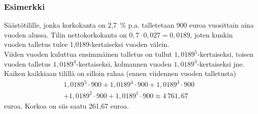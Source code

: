\documentclass{beamer}\usepackage[]{graphicx}\usepackage[]{color}
\theoremstyle{remark}
\newtheorem{esim}{Esimerkki}
\newtheorem{ratkaisu}{Ratkaisuehdotus}
\newcommand{\pblock}{\\ \vspace{0.5cm}\pause}
\begin{document}
% 

\begin{frame}
    \frametitle{Esimerkki}  
    Säästötilille, jonka korkokanta on 2{,}7~\% p.a. talletetaan 900 euroa vuosittain aina vuoden alussa. 
    \pause 
    Tilin nettokorkokanta on \(0,7\cdot0{,}027 = 0{,}0189\), joten kunkin vuoden talletus tulee 1{,}0189-kertaiseksi vuoden välein. 
    \pblock 
    Viiden vuoden kuluttua ensimmäinen talletus on tullut \(1{,}0189^5\)-kertaiseksi\pause, toisen vuoden talletus \(1{,}0189^4\)-kertaiseksi\pause, kolmannen vuoden \(1{,}0189^3\)-kertaiseksi jne. \pause Kaiken kaikkiaan tilillä on silloin rahaa (ennen viidennen vuoden talletusta)
    \begin{multline*}
        1{,}0189^5\cdot900 + 1{,}0189^4\cdot900 + 1{,}0189^3\cdot900 \\  + 1{,}0189^2\cdot900 + 1{,}0189^1\cdot900 \approx 4~761{,}67
    \end{multline*}
    euroa. 
    \pause 
    Korkoa on siis saatu 261{,}67 euroa.
\end{frame}
\end{document}
